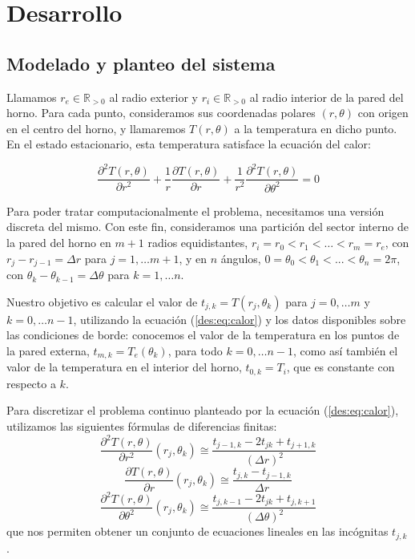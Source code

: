 \section{Desarrollo}

  \subsection{Modelado y planteo del sistema}

    Llamamos $r_e \in \mathbb{R}_{>0}$ al radio exterior y $r_i \in \mathbb{R}_{>0}$ al radio interior de la pared del horno. Para cada punto, consideramos sus coordenadas polares $(r, \theta)$ con origen en el centro del horno, y llamaremos $T(r, \theta)$ a la temperatura en dicho punto. En el estado estacionario, esta temperatura satisface la ecuación del calor:

    \begin{equation} \label{des:eq:calor}
      \frac{\partial^2 T(r, \theta)}{\partial r^2} + \frac{1}{r} \frac{\partial T(r, \theta)}{\partial r} + \frac{1}{r^2} \frac{\partial^2 T(r, \theta)}{\partial \theta^2} = 0
    \end{equation}

    Para poder tratar computacionalmente el problema, necesitamos una versión discreta del mismo. Con este fin, consideramos una partición del sector interno de la pared del horno en $m + 1$ radios equidistantes, $r_i = r_0 < r_1 < \dots < r_m = r_e$, con $r_j - r_{j-1} = \Delta r$ para $j = 1, \dots m+1$, y en $n$ ángulos, $0 = \theta_0 < \theta_1 < ... < \theta_n = 2\pi$, con $\theta_k - \theta_{k-1} = \Delta \theta$ para $k = 1, \dots n$.

    Nuestro objetivo es calcular el valor de $t_{j,k} = T(r_j, \theta_k)$ para $j = 0, \dots m$ y $k = 0, \dots n-1$, utilizando la ecuación (\ref{des:eq:calor}) y los datos disponibles sobre las condiciones de borde: conocemos el valor de la temperatura en los puntos de la pared externa, $t_{m,k} = T_e(\theta_k)$, para todo $k = 0, \dots n-1$, como así también el valor de la temperatura en el interior del horno, $t_{0,k} = T_i$, que es constante con respecto a $k$.

    Para discretizar el problema continuo planteado por la ecuación (\ref{des:eq:calor}), utilizamos las siguientes fórmulas de diferencias finitas:
    \[ \frac{\partial^2 T(r, \theta)}{\partial r^2}(r_j, \theta_k) \cong \frac{t_{j-1,k} - 2 t_{jk} + t_{j+1,k}}{(\Delta r)^2} \]
    \[ \frac{\partial T(r, \theta)}{\partial r}(r_j, \theta_k) \cong \frac{t_{j,k} - t_{j-1,k}}{\Delta r} \]
    \[ \frac{\partial^2 T(r, \theta)}{\partial \theta^2}(r_j, \theta_k) \cong \frac{t_{j,k-1} - 2 t_{jk} + t_{j,k+1}}{(\Delta \theta)^2} \]
    que nos permiten obtener un conjunto de ecuaciones lineales en las incógnitas $t_{j,k}$.

